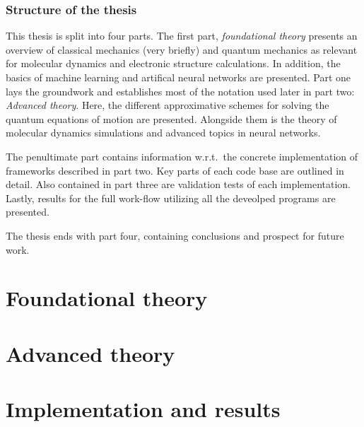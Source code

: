 \documentclass[twoside,english]{uiofysmaster}
\begin{document}
\section{Structure of the thesis}
This thesis is split into four parts. The first part, \emph{foundational theory} presents an overview of classical mechanics (very briefly) and quantum mechanics as relevant for molecular dynamics and electronic structure calculations. In addition, the basics of machine learning and artifical neural networks are presented. Part one lays the groundwork and establishes most of the notation used later in part two: \emph{Advanced theory}. Here, the different approximative schemes for solving the quantum equations of motion are presented. Alongside them is the theory of molecular dynamics simulations and advanced topics in neural networks.

The penultimate part contains information w.r.t.\ the concrete implementation of frameworks described in part two. Key parts of each code base are outlined in detail. Also contained in part three are validation tests of each implementation. Lastly, results for the full work-flow utilizing all the deveolped programs are presented.

The thesis ends with part four, containing conclusions and prospect for future work.

\nocite{ISO80000}
\nocite{stende}
\nocite{treider}
\nocite{dragly}

\part{Foundational theory}




\part{Advanced theory}




\part{Implementation and results}




\end{document}
